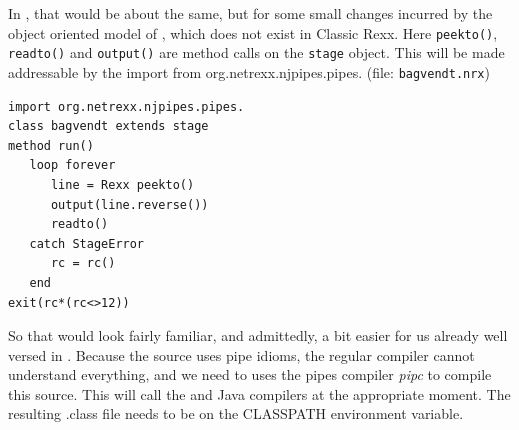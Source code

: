 In \nr{}, that would be about the same, but for some small changes
incurred by the object oriented model of \nr{}, which does not exist in Classic Rexx. Here \texttt{peekto()}, \texttt{readto()} and
\texttt{output()} are method calls on the \texttt{stage} object. This
will be made addressable
by the import from org.netrexx.njpipes.pipes. (file: \texttt{bagvendt.nrx})
\begin{lstlisting}
import org.netrexx.njpipes.pipes.
class bagvendt extends stage
method run()
   loop forever
      line = Rexx peekto()
      output(line.reverse())
      readto()
   catch StageError
      rc = rc()
   end
exit(rc*(rc<>12))
\end{lstlisting}
So that would look fairly familiar, and admittedly, a bit easier for us already well versed in \nr{}.
Because the source uses pipe idioms, the regular \nr{} compiler cannot understand everything, and we need to uses the pipes compiler \emph{pipc} to compile this source. This will call the \nr{} and Java compilers at the appropriate moment. The resulting .class file needs to be on the CLASSPATH environment variable.

